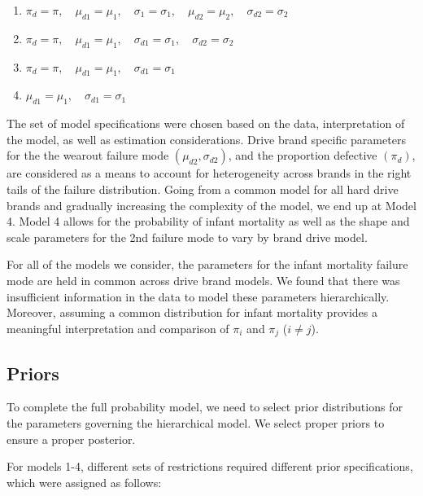 \documentclass[12pt]{article}
\begin{document}
\begin{enumerate}
\item $\pi_{d} = \pi,\quad \mu_{d1} = \mu_1,\quad \sigma_{1}=\sigma_1,\quad \mu_{d2} = \mu_2,\quad \sigma_{d2} = \sigma_2$
\item $\pi_{d} = \pi,\quad \mu_{d1} = \mu_1,\quad \sigma_{d1}=\sigma_1,\quad \sigma_{d2} = \sigma_2$
\item $\pi_{d} = \pi,\quad \mu_{d1} = \mu_1,\quad \sigma_{d1}=\sigma_1$
\item $\mu_{d1} = \mu_1,\quad \sigma_{d1}=\sigma_1$
\end{enumerate}

The set of model specifications were chosen based on the data, interpretation of the model, as well as estimation considerations. Drive brand specific parameters for the the wearout failure mode $(\mu_{d2},\sigma_{d2})$, and the proportion defective $(\pi_d)$, are considered as a means to account for heterogeneity across brands in the right tails of the failure distribution.  Going from a common model for all hard drive brands and gradually increasing the complexity of the model, we end up at Model 4.  Model 4 allows for the probability of infant mortality as well as the shape and scale parameters for the 2nd failure mode to vary by brand drive model.

For all of the models we consider, the parameters for the infant mortality failure mode are held in common across drive brand models. We found that there was insufficient information in the data to model these parameters hierarchically.  Moreover, assuming a common distribution for infant mortality provides a meaningful interpretation and comparison of $\pi_i$ and $\pi_j$ ($i \neq j$). 

\subsection{Priors}
To complete the full probability model, we need to select prior distributions for the parameters governing the hierarchical model. We select proper priors to ensure a proper posterior.

For models 1-4, different sets of restrictions required different prior specifications, which were assigned as follows:
\end{document}
